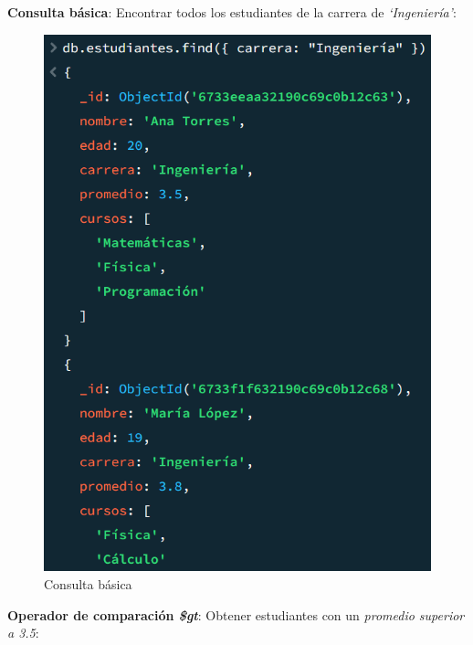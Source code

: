 \textbf{Consulta básica}: Encontrar todos los estudiantes de la carrera de \textit{`Ingeniería'}:

\begin{figure}[H]
  \centering
  \includegraphics[scale = 0.8]{Imagenes/parte3/3.1.png}
  \caption{Consulta básica}
\end{figure}

\textbf{Operador de comparación \emph{\$gt}}: Obtener estudiantes con un \textit{promedio superior a 3.5}:

